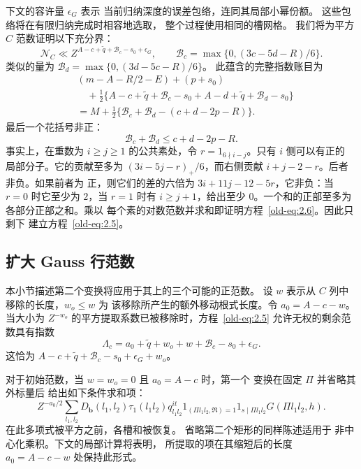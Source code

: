 \documentclass[11pt,a4paper]{article}
\numberwithin{equation}{section}
\numberwithin{figure}{section}
\theoremstyle{definition}
\theoremstyle{remark}
\begin{document}
下文的容许量 \(\epsilon_G\) 表示
当前归纳深度的误差包络，连同其局部小幂份额。
这些包络将在有限归纳完成时相容地选取，
整个过程使用相同的槽网格。
我们将为平方 \(C\)
范数证明以下充分界：
\begin{equation}
 \mathcal N_C\ll
 Z^{A-c+\widetilde q+\mathcal B_c-s_0+\epsilon_G},
 \qquad
 \mathcal B_c=\max\{0,(3c-5d-R)/6\}.
 \label{old-eq:2.5}
\end{equation}
类似的量为
\(\mathcal B_d=\max\{0,(3d-5c-R)/6\}\)。
此蕴含的完整指数账目为
\[
 \begin{aligned}
 &(m-A-R/2-E)+(p+s_0)\\
 &\quad+\tfrac12\{A-c+\widetilde q+\mathcal B_c-s_0
                  +A-d+\widetilde q+\mathcal B_d-s_0\}\\
 &=M+\tfrac12\{\mathcal B_c+\mathcal B_d-(c+d-2p-R)\}.
 \end{aligned}
\]
最后一个花括号非正：
\begin{equation}
 \mathcal B_c+\mathcal B_d\le c+d-2p-R.
 \label{old-eq:2.6}
\end{equation}
事实上，在重数为 \(i\ge j\ge1\) 的公共素处，令
\(r=1_{6\nmid i-j}\)。只有 \(i\) 侧可以有正的
局部分子。它的贡献至多为
\((3i-5j-r)_+/6\)，而右侧贡献
\(i+j-2-r\)。后者非负。如果前者为
正，则它们的差的六倍为
\(3i+11j-12-5r\)，它非负：当 \(r=0\) 时它至少为
\(2\)，当 \(r=1\) 时有 \(i\ge j+1\)，给出至少
\(0\)。一个和的正部至多为各部分正部之和。乘以
每个素的对数范数并求和即证明方程~\eqref{old-eq:2.6}。因此只剩下
建立方程~\eqref{old-eq:2.5}。

\subsection{扩大 Gauss 行范数}\label{sec:plain-gauss-enlargement}

本小节描述第二个变换将应用于其上的三个可能的正范数。
设 \(w\) 表示从 \(C\) 列中移除的长度，\(w_o\le w\) 为
该移除所产生的额外移动根式长度。令
\(a_0=A-c-w\)。当大小为
\(Z^{-w_o}\) 的平方提取系数已被移除时，方程~\eqref{old-eq:2.5}
允许无权的剩余范数具有指数
\begin{equation}
 \Lambda_c=
 a_0+\widetilde q+w_o+w+\mathcal B_c-s_0+\epsilon_G.
 \label{old-eq:2.7}
\end{equation}
这恰为 \(A-c+\widetilde q+\mathcal B_c-s_0+\epsilon_G+w_o\)。

对于初始范数，当 \(w=w_o=0\) 且 \(a_0=A-c\) 时，第一个
变换在固定 \(\Pi\) 并省略其外标量后
给出如下条件求和项：
\begin{equation}
 Z^{-a_0/2}\sum_{l_1,l_2}
 D_{\mathbf b}(l_1,l_2)\tau_1(l_1l_2)q_{l_1l_2}^{it}
 1_{(\Pi l_1l_2,\mathfrak R)=1}1_{s\mid\Pi l_1l_2}
 G(\Pi l_1l_2,h).
 \label{old-eq:2.18c}
\end{equation}
在此多项式被平方之前，各槽和被恢复。
省略第二个矩形的同样陈述适用于
非中心化乘积。下文的局部计算将表明，
所提取的项在其缩短后的长度 \(a_0=A-c-w\) 处保持此形式。
\end{document}
